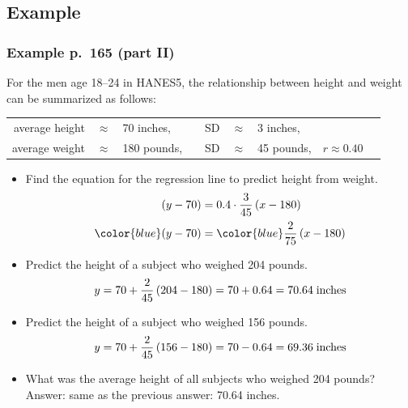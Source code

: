 \documentclass[t]{beamer}
\begin{document}
\subsection{Example}
\begin{frame}
\frametitle{Example p.\ 165 (part II)}

\footnotesize 
For the men age 18--24 in HANES5, the relationship between height and 
weight can be summarized as follows:\vspace{-3pt}
\begin{center}
{\setlength{\tabcolsep}{2pt}\begin{tabular}{rclcrclcc}
average height & $\approx$ & 70 inches, & \hspace{5pt} & SD & $\approx$ & 3 inches,\\
average weight & $\approx$ & 180 pounds, & \hspace{5pt} & SD & $\approx$ & 45 pounds, &
   \hspace{10pt} $r\approx 0.40$\\[-8pt]
\end{tabular}}
\end{center}
\begin{itemize}
\item<2-> Find the equation for the regression line to predict {\color{darkgreen}height} from 
   {\color{darkgreen}weight}.\vspace{-5pt}
  \begin{align*}
  (y - 70) &= 0.4\cdot \frac{3}{45}\,(x - 180)\\[1pt]
{\color{blue}  (y - 70)} &= {\color{blue}\frac{2}{75}\,(x - 180)}\vspace{-8pt}
\end{align*}
\item<3-> Predict the height  of a subject who weighed  204 pounds.\vspace{-5pt}
    \[y = 70 + \frac{2}{45}\,(204 - 180) = 70 + 0.64 = 70.64\;\mbox{inches}\vspace{-5pt}\]
\item<4-> Predict the height of a subject who weighed 156 pounds.\vspace{-5pt}
    \[y = 70 + \frac{2}{45}\,(156 - 180) = 70 - 0.64 = 69.36\;\mbox{inches}\vspace{-5pt}\]
\item<5-> What was the average height of all subjects  who weighed 204 pounds?\\
    Answer:  same as the previous answer:  70.64 inches.
\end{itemize}

\end{frame}
\end{document}
